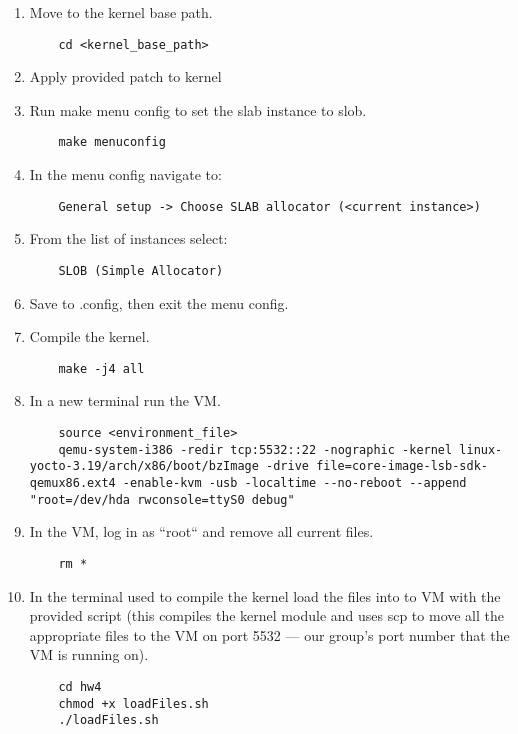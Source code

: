 \documentclass[onecolumn, draftclsnofoot,10pt, compsoc]{IEEEtran}
\begin{document}
\begin{enumerate}
    \item Move to the kernel base path.
    \begin{lstlisting}
    cd <kernel_base_path>
    \end{lstlisting}

    \item Apply provided patch to kernel
    
    \item Run make menu config to set the slab instance to slob.
    \begin{lstlisting}
    make menuconfig
    \end{lstlisting}
    
    \item In the menu config navigate to: 
    \begin{lstlisting}
    General setup -> Choose SLAB allocator (<current instance>)
    \end{lstlisting}
    
    \item From the list of instances select:
    \begin{lstlisting}
    SLOB (Simple Allocator)
    \end{lstlisting}
    
    \item Save to .config, then exit the menu config.
    
    \item Compile the kernel.
    \begin{lstlisting}
    make -j4 all
    \end{lstlisting}
    
    \item In a new terminal run the VM.
    \begin{lstlisting}
    source <environment_file>
    qemu-system-i386 -redir tcp:5532::22 -nographic -kernel linux-yocto-3.19/arch/x86/boot/bzImage -drive file=core-image-lsb-sdk-qemux86.ext4 -enable-kvm -usb -localtime --no-reboot --append "root=/dev/hda rwconsole=ttyS0 debug"
    \end{lstlisting}
    
    \item In the VM, log in as ``root`` and remove all current files.
    \begin{lstlisting}
    rm *
    \end{lstlisting}
    
	\item In the terminal used to compile the kernel load the files into to VM with the provided script (this compiles the kernel module and uses scp to move all the appropriate files to the VM on port 5532 --- our group's port number that the VM is running on).
	\begin{lstlisting}
    cd hw4
    chmod +x loadFiles.sh
    ./loadFiles.sh
	\end{lstlisting}
	

\end{enumerate}
\end{document}
